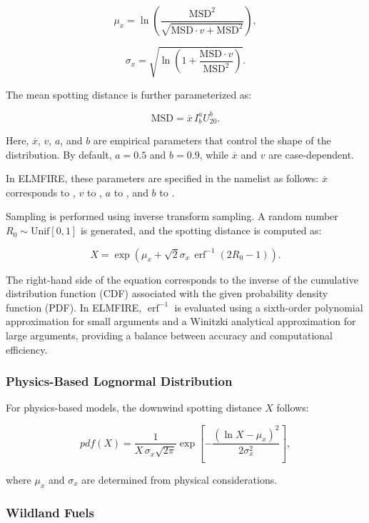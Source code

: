 \[
\mu_x = \ln\!\left(\frac{\text{MSD}^{2}}{\sqrt{\text{MSD}\cdot v + \text{MSD}^{2}}}\right),
\]

\[
\sigma_x = \sqrt{\ln\!\left(1 + \frac{\text{MSD}\cdot v}{\text{MSD}^{2}}\right)}.
\]

The mean spotting distance is further parameterized as:

\[
\text{MSD} = \overline{x} \, I_b^{a} U_{20}^{b}.
\]

Here, $\overline{x}$, $v$, $a$, and $b$ are empirical parameters that control the shape of the distribution. By default, $a = 0.5$ and $b = 0.9$, while $\overline{x}$ and $v$ are case-dependent.

In ELMFIRE, these parameters are specified in the  namelist as follows: $\overline{x}$ corresponds to , $v$ to , $a$ to , and $b$ to .

Sampling is performed using inverse transform sampling. A random number $R_0 \sim \text{Unif}[0,1]$ is generated, and the spotting distance is computed as:

\[
X = \exp\left(\mu_x + \sqrt{2}\sigma_x \, \operatorname{erf}^{-1}(2R_0 - 1)\right).
\]

The right-hand side of the equation corresponds to the inverse of the cumulative distribution function (CDF) associated with the given probability density function (PDF). In ELMFIRE, $\operatorname{erf}^{-1}$ is evaluated using a sixth-order polynomial approximation for small arguments and a Winitzki analytical approximation for large arguments, providing a balance between accuracy and computational efficiency.

\subsubsection*{Physics-Based Lognormal Distribution}

For physics-based models, the downwind spotting distance $X$ follows:

\[
pdf(X) = \frac{1}{X \, \sigma_x \sqrt{2\pi}} 
\exp\!\left[-\frac{(\ln X - \mu_x)^2}{2\sigma_x^2}\right],
\]

where $\mu_x$ and $\sigma_x$ are determined from physical considerations.

\subsubsection*{Wildland Fuels}

